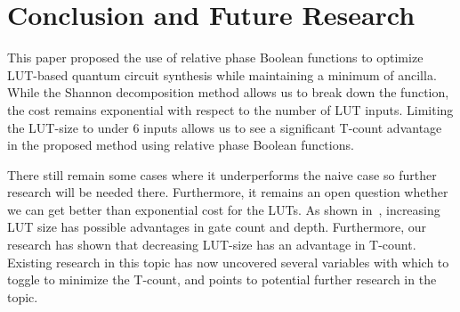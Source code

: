 \vspace*{-0.25cm}
\section{Conclusion and Future Research}
\label{Sec:concl}
This paper proposed the use of relative phase Boolean functions to optimize LUT-based quantum circuit synthesis while maintaining a minimum of ancilla. While the Shannon decomposition method allows us to break down the function, the cost remains exponential with respect to the number of LUT inputs. Limiting the LUT-size to under 6 inputs allows us to see a significant T-count advantage in the proposed method using relative phase Boolean functions.

There still remain some cases where it underperforms the naive case so further research will be needed there. Furthermore, it remains an open question whether we can get better than exponential cost for the LUTs. As shown in~\cite{bib-lhrs-soeken}, increasing LUT size has possible advantages in gate count and depth. Furthermore, our research has shown that decreasing LUT-size has an advantage in T-count. Existing research in this topic has now uncovered several variables with which to toggle to minimize the T-count, and points to potential further research in the topic.
